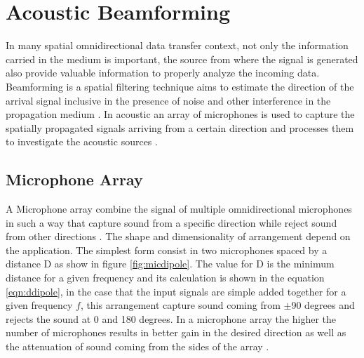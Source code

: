 \label{section:}




\section{Acoustic Beamforming}

In many spatial omnidirectional data transfer context, not only the information carried in the medium is important, the source from where the signal is generated also provide valuable information to properly analyze the incoming data. Beamforming is a spatial filtering technique aims to estimate the direction of the arrival signal inclusive in the presence of noise and other interference in the propagation medium \cite{BEA01}. In acoustic an array of microphones is used to capture the spatially propagated signals arriving from a certain direction and processes them to investigate the acoustic sources \cite{BEA02}.
\label{section:Concept2}

\subsection{Microphone Array}

A Microphone array combine the signal of multiple omnidirectional microphones in such a way that capture sound from a specific direction while reject sound from other directions \cite{MA01}. The shape and dimensionality of arrangement depend on the application. The simplest form consist in two microphones spaced by a distance D as show in figure \ref{fig:micdipole}. The value for D is the minimum distance for a given frequency and its calculation is shown in the equation \ref{eqn:ddipole}, in the case that the input signals are simple added together for a given frequency \(f\), this arrangement capture sound coming from \(\pm\)90 degrees and rejects the sound at 0 and 180 degrees. In a microphone array the higher the number of microphones results in better gain in the desired direction as well as the attenuation  of sound coming from the sides of the array \cite{MA02}.     

